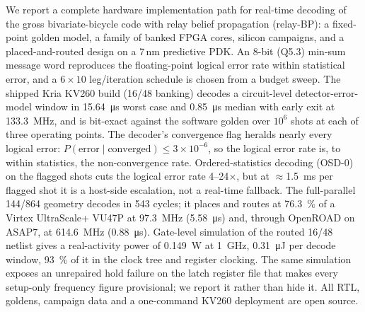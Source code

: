 We report a complete hardware implementation path for real-time decoding of the \gross{} gross
bivariate-bicycle code with relay belief propagation (relay-BP): a fixed-point golden model,
a family of banked FPGA cores, silicon campaigns, and a placed-and-routed design on a 7\,nm
predictive PDK. An 8-bit (Q5.3) min-sum message word reproduces the floating-point logical error
rate within statistical error, and a $6\times10$ leg/iteration schedule is chosen from a budget
sweep. The shipped Kria KV260 build (16/48 banking) decodes a circuit-level detector-error-model
window in \SI{15.64}{\micro\second} worst case and \SI{0.85}{\micro\second} median with early exit
at \SI{133.3}{\mega\hertz}, and is bit-exact against the software golden over $10^6$ shots at each of
three operating points. The decoder's convergence flag heralds nearly every logical error:
$P(\text{error}\mid\text{converged}) \le 3\times10^{-6}$, so the logical error rate is, to within
statistics, the non-convergence rate. Ordered-statistics decoding (OSD-0) on the flagged shots cuts
the logical error rate 4--24$\times$, but at $\approx$\SI{1.5}{\milli\second} per flagged shot it is a
host-side escalation, not a real-time fallback. The full-parallel 144/864 geometry decodes in 543 cycles; it places and routes at
\SI{76.3}{\percent} of a Virtex UltraScale+ VU47P at \SI{97.3}{\mega\hertz} (\SI{5.58}{\micro\second})
and, through OpenROAD on ASAP7, at \SI{614.6}{\mega\hertz} (\SI{0.88}{\micro\second}). Gate-level
simulation of the routed 16/48 netlist gives a real-activity power of \SI{0.149}{\watt} at \SI{1}{\giga\hertz},
\SI{0.31}{\micro\joule} per decode window, \SI{93}{\percent} of it in the clock tree and register
clocking. The same simulation exposes an unrepaired hold failure on the latch register file that
makes every setup-only frequency figure provisional; we report it rather than hide it. All RTL,
goldens, campaign data and a one-command KV260 deployment are open source.
